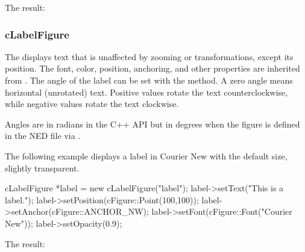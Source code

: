 

The result:

\begin{center}

\end{center}


\subsubsection{cLabelFigure}
\label{sec:graphics:labelfigure}

The  displays text that is unaffected by zooming or
transformations, except its position. The font, color, position, anchoring, and
other properties are inherited from . The angle of
the label can be set with the  method. A zero angle means
horizontal (unrotated) text. Positive values rotate the text counterclockwise,
while negative values rotate the text clockwise.

\begin{note}
Angles are in radians in the C++ API but in degrees when the figure is defined
in the NED file via .
\end{note}

The following example displays a label in Courier New with the default size, slightly transparent.

\begin{cpp}
cLabelFigure *label = new cLabelFigure("label");
label->setText("This is a label.");
label->setPosition(cFigure::Point(100,100));
label->setAnchor(cFigure::ANCHOR_NW);
label->setFont(cFigure::Font("Courier New"));
label->setOpacity(0.9);
\end{cpp}


The result:

\begin{center}

\end{center}


